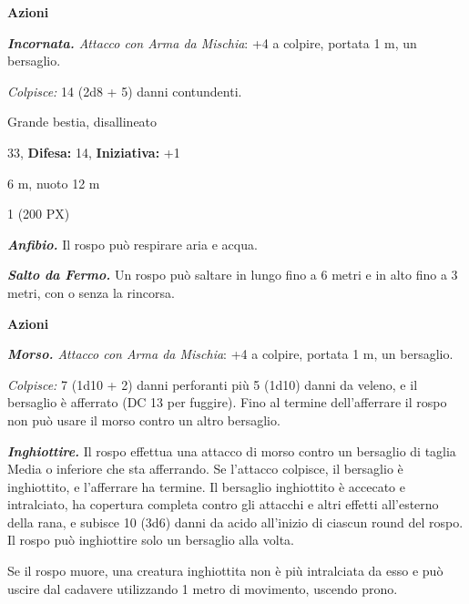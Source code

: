 \begin{multicols}{2}
{\textbf{Azioni}

\emph{\textbf{Incornata.} Attacco con Arma da Mischia}: +4 a colpire, portata 1 m, un bersaglio.

\emph{Colpisce:} 14 (2d8 + 5) danni contundenti.

\begin{description}[noitemsep, topsep=0pt, parsep=0pt, partopsep=0pt, leftmargin=0cm, labelwidth=2.2cm]
    \item[\textbf{Taglia/Tipo:}] Grande bestia, disallineato
    \item[\textbf{Caratt.:}] 
    \item[\textbf{Punti Ferita:}] 33,  \textbf{Difesa:} 14,  \textbf{Iniziativa:} +1
    \item[\textbf{Tiri Salvez.:}] 
    \item[\textbf{Movimento:}] 6 m, nuoto 12 m
    \item[\textbf{Sfida:}] 1 (200 PX)\smallskip
\end{description}

\emph{\textbf{Anfibio.}} Il rospo può respirare aria e acqua.

\emph{\textbf{Salto da Fermo.}} Un rospo può saltare in lungo fino a 6 metri e in alto fino a 3 metri, con o senza la rincorsa.

\textbf{Azioni}

\emph{\textbf{Morso.} Attacco con Arma da Mischia}: +4 a colpire, portata 1 m, un bersaglio.

\emph{Colpisce:} 7 (1d10 + 2) danni perforanti più 5 (1d10) danni da veleno, e il bersaglio è afferrato (DC 13 per fuggire). Fino al termine dell'afferrare il rospo non può usare il morso contro un altro bersaglio.

\emph{\textbf{Inghiottire.}} Il rospo effettua una attacco di morso contro un bersaglio di taglia Media o inferiore che sta afferrando. Se l'attacco colpisce, il bersaglio è inghiottito, e l'afferrare ha termine. Il bersaglio inghiottito è accecato e intralciato, ha copertura completa contro gli attacchi e altri effetti all'esterno della rana, e subisce 10 (3d6) danni da acido all'inizio di ciascun round del rospo. Il rospo può inghiottire solo un bersaglio alla volta.

Se il rospo muore, una creatura inghiottita non è più intralciata da esso e può uscire dal cadavere utilizzando 1 metro di movimento, uscendo prono.

}
\end{multicols}
